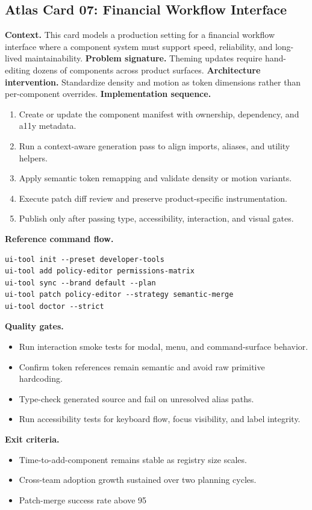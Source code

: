 \subsection*{Atlas Card 07: Financial Workflow Interface}
\textbf{Context.} This card models a production setting for a financial workflow interface where a component system must support speed, reliability, and long-lived maintainability.
\textbf{Problem signature.} Theming updates require hand-editing dozens of components across product surfaces.
\textbf{Architecture intervention.} Standardize density and motion as token dimensions rather than per-component overrides.
\textbf{Implementation sequence.}
\begin{enumerate}[leftmargin=*, itemsep=0.28em]
  \item Create or update the component manifest with ownership, dependency, and a11y metadata.
  \item Run a context-aware generation pass to align imports, aliases, and utility helpers.
  \item Apply semantic token remapping and validate density or motion variants.
  \item Execute patch diff review and preserve product-specific instrumentation.
  \item Publish only after passing type, accessibility, interaction, and visual gates.
\end{enumerate}
\textbf{Reference command flow.}
\begin{verbatim}
ui-tool init --preset developer-tools
ui-tool add policy-editor permissions-matrix
ui-tool sync --brand default --plan
ui-tool patch policy-editor --strategy semantic-merge
ui-tool doctor --strict
\end{verbatim}
\textbf{Quality gates.}
\begin{itemize}[leftmargin=*, itemsep=0.24em]
  \item Run interaction smoke tests for modal, menu, and command-surface behavior.
  \item Confirm token references remain semantic and avoid raw primitive hardcoding.
  \item Type-check generated source and fail on unresolved alias paths.
  \item Run accessibility tests for keyboard flow, focus visibility, and label integrity.
\end{itemize}
\textbf{Exit criteria.}
\begin{itemize}[leftmargin=*, itemsep=0.24em]
  \item Time-to-add-component remains stable as registry size scales.
  \item Cross-team adoption growth sustained over two planning cycles.
  \item Patch-merge success rate above 95%
\end{itemize}
\clearpage
